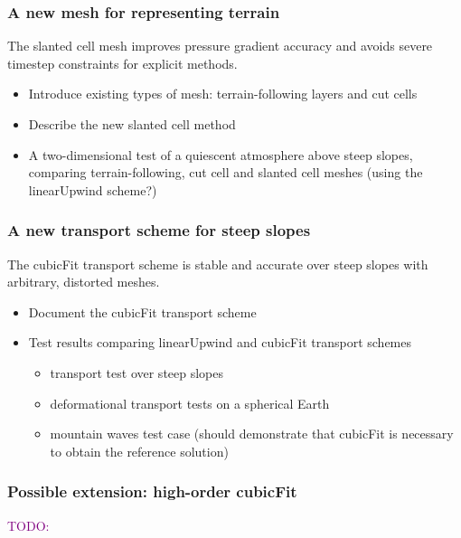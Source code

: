 \documentclass[a4paper,11pt]{article}
\newcommand{\TODO}[1]{\textcolor{purple}{TODO: \emph{#1}}}
\begin{document}
\subsubsection*{A new mesh for representing terrain}
\noindent The slanted cell mesh improves pressure gradient accuracy and avoids severe timestep constraints for explicit methods.
\begin{itemize}[itemsep=0.1em]
	\item Introduce existing types of mesh: terrain-following layers and cut cells
	\item Describe the new slanted cell method
	\item A two-dimensional test of a quiescent atmosphere above steep slopes, comparing terrain-following, cut cell and slanted cell meshes (using the linearUpwind scheme?)
\end{itemize}

\subsubsection*{A new transport scheme for steep slopes}
\noindent The cubicFit transport scheme is stable and accurate over steep slopes with arbitrary, distorted meshes.
\begin{itemize}[itemsep=0.1em]
	\item Document the cubicFit transport scheme
	\item {Test results comparing linearUpwind and cubicFit transport schemes
	\begin{itemize}[itemsep=0.1em,topsep=0pt]
		\item \citet{shaw2017} transport test over steep slopes 
		\item \citet{lauritzen2012} deformational transport tests on a spherical Earth
		\item \citet{schaer2002} mountain waves test case (should demonstrate that cubicFit is necessary to obtain the reference solution)
	\end{itemize}}
\end{itemize}

\subsubsection*{Possible extension: high-order cubicFit}
\noindent \TODO{}
	
\end{document}
